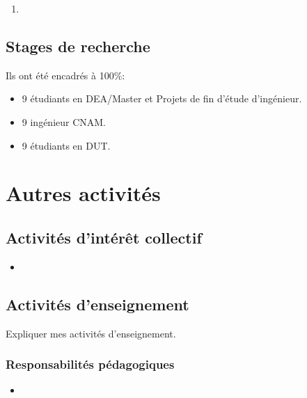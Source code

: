 \documentclass[french]{hdrapplication}
\begin{document}
\begin{enumerate}
\item 
\end{enumerate}

\subsection{Stages de recherche}

Ils ont été encadrés à 100\%:
\begin{itemize}
\item 9 étudiants en DEA/Master et Projets de fin d'étude d'ingénieur.
\item 9 ingénieur CNAM.
\item 9 étudiants en DUT.
\end{itemize}

\section{Autres activités}

\subsection{Activités d'intérêt collectif}

\begin{itemize}
\item 
\end{itemize}

\subsection{Activités d'enseignement}

Expliquer mes activités d'enseignement.

\subsubsection{Responsabilités pédagogiques}

\begin{itemize}
\item 
\end{itemize}






\hdrpublicationlist
\end{document}
